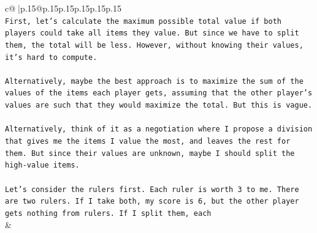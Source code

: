 \documentclass{article}
\begin{document}
{\begin{supertabular}{c@{$\;$}|p{.15\linewidth}@{}p{.15\linewidth}p{.15\linewidth}p{.15\linewidth}p{.15\linewidth}p{.15\linewidth}}
{{{\\ 
\texttt{First, let's calculate the maximum possible total value if both players could take all items they value. But since we have to split them, the total will be less. However, without knowing their values, it's hard to compute.} \\
\\ 
\texttt{Alternatively, maybe the best approach is to maximize the sum of the values of the items each player gets, assuming that the other player's values are such that they would maximize the total. But this is vague.} \\
\\ 
\texttt{Alternatively, think of it as a negotiation where I propose a division that gives me the items I value the most, and leaves the rest for them. But since their values are unknown, maybe I should split the high{-}value items.} \\
\\ 
\texttt{Let's consider the rulers first. Each ruler is worth 3 to me. There are two rulers. If I take both, my score is 6, but the other player gets nothing from rulers. If I split them, each} \\
            }
        }
    }
    & \\ \\


\end{supertabular}}
\end{document}
